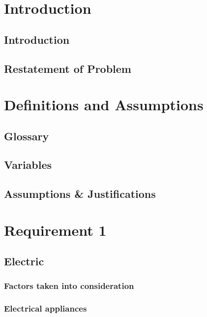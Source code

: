 \documentclass[12pt]{article}
\begin{document}

\pagestyle{fancy}
\fancyhf{}
\setlength{\headheight}{32.09pt}

\tableofcontents
\newpage

\section{Introduction}
\subsection{Introduction}

\subsection{Restatement of Problem}


\section{Definitions and Assumptions}
\subsection{Glossary}

\subsection{Variables}

\subsection{Assumptions \& Justifications}

\section{Requirement 1}
\subsection{Electric}
\subsubsection{Factors taken into consideration}

\subsubsection{Electrical appliances}

\end{document}
